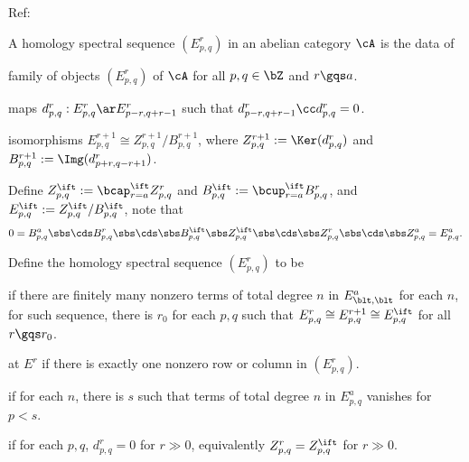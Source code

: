 \documentclass[article, a4paper, twoside]{universal}
\begin{document}
\confighead{}{}{}

Ref: \cite{Weibel1994}


\begin{dfn}[5.2.1, 5.2.8]
    A homology spectral sequence $(E_{p,q}^{r}) $ in an abelian category $\cA$ is the data of
    \begin{itm}
        \item family of objects $(E_{p,q}^{r})$ of $\cA$ for all $p,q\in\bZ$ and $r\gqs a$.
        \item maps $d_{p,q}^{r}:E_{p,q}^{r}\ar E_{p-r,q+r-1}^{r}$ such that $d_{p-r,q+r-1}^{r}\cc d_{p,q}^{r}=0$.
        \item isomorphisms $E_{p,q}^{r+1}\cong Z_{p,q}^{r+1}/B_{p,q}^{r+1}$, where $Z_{p,q}^{r+1}:=\Ker(d_{p,q}^{r})$ and $B_{p,q}^{r+1}:=\Img(d_{p+r,q-r+1}^{r})$.
    \end{itm}
    Define $Z_{p,q}^{\ift}:=\bcap_{r=a}^{\ift}Z_{p,q}^{r}$ and $B_{p,q}^{\ift}:=\bcup_{r=a}^{\ift}B_{p,q}^{r}$, and $E_{p,q}^{\ift}:=Z_{p,q}^{\ift}/B_{p,q}^{\ift}$, note that
    \[
        0=B_{p,q}^{a}\sbs\cds B_{p,q}^{r}\sbs\cds\sbs B_{p,q}^{\ift}\sbs Z_{p,q}^{\ift}\sbs\cds\sbs Z_{p,q}^{r}\sbs\cds\sbs Z_{p,q}^{a}=E_{p,q}^{a}.
    \]
\end{dfn}

\begin{dfn}[5.2.5, 5.2.7, 5.2.9, 5.2.10]
    Define the homology spectral sequence $(E_{p,q}^{r})$ to be
    \begin{itm}
        \item {} if there are finitely many nonzero terms of total degree $n$ in $E_{\blt,\blt}^{a}$ for each $n$, for such sequence, there is $r_{0}$ for each $p,q$ such that $E_{p,q}^{r}\cong E_{p,q}^{r+1}\cong E_{p,q}^{\ift}$ for all $r\gqs r_{0}$.
        \item {} at $E^{r}$ if there is exactly one nonzero row or column in $(E_{p,q}^{r})$.
        \item {} if for each $n$, there is $s$ such that terms of total degree $n$ in $E_{p,q}^{a}$ vanishes for $p<s$.
        \item {} if for each $p,q$, $d_{p,q}^{r}=0$ for $r\gg 0$, equivalently $Z_{p,q}^{r}=Z_{p,q}^{\ift}$ for $r\gg 0$.
    \end{itm}
\end{dfn}
\end{document}
